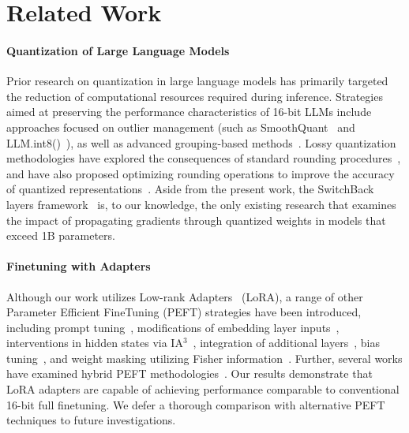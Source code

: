 \section{Related Work}

\paragraph{Quantization of Large Language Models} Prior research on quantization in large language models has primarily targeted the reduction of computational resources required during inference. Strategies aimed at preserving the performance characteristics of 16-bit LLMs include approaches focused on outlier management (such as SmoothQuant~\citep{xiao2022smoothquant} and LLM.int8()~\citep{dettmers2022llm}), as well as advanced grouping-based methods~\citep{park2022nuqmm, yao2022zeroquant}. Lossy quantization methodologies have explored the consequences of standard rounding procedures~\citep{dettmers2022case,zeng2022glm,pope2022efficiently}, and have also proposed optimizing rounding operations to improve the accuracy of quantized representations~\citep{frantar2022gptq}. Aside from the present work, the SwitchBack layers framework~\citep{wortsman2023stable} is, to our knowledge, the only existing research that examines the impact of propagating gradients through quantized weights in models that exceed 1B parameters.

\paragraph{Finetuning with Adapters} Although our work utilizes Low-rank Adapters~\citep{hu2021lora} (LoRA), a range of other Parameter Efficient FineTuning (PEFT) strategies have been introduced, including prompt tuning~\citep{qin2021learning,lester2021power,li2021prefix}, modifications of embedding layer inputs~\citep{an2022input}, interventions in hidden states via IA$^3$~\citep{liu2022few}, integration of additional layers~\citep{houlsby2019parameter}, bias tuning~\citep{zaken2021bitfit}, and weight masking utilizing Fisher information~\citep{sung2021training}. Further, several works have examined hybrid PEFT methodologies~\citep{henderson2021compacter}. Our results demonstrate that LoRA adapters are capable of achieving performance comparable to conventional 16-bit full finetuning. We defer a thorough comparison with alternative PEFT techniques to future investigations.

